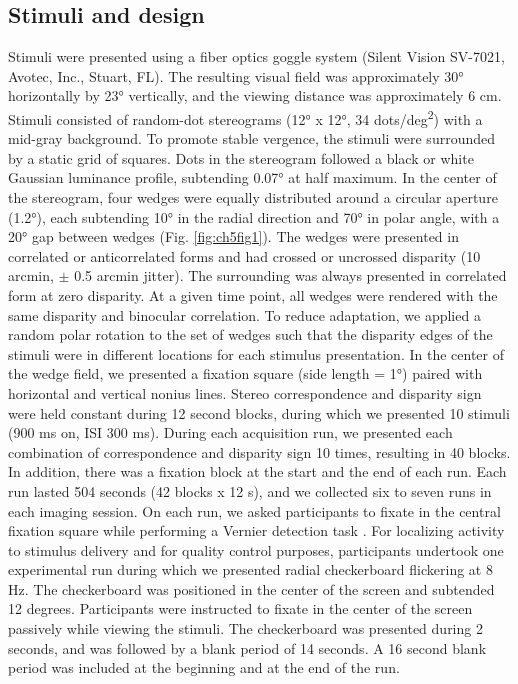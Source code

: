 \subsection{Stimuli and design}
Stimuli were presented using a fiber optics goggle system (Silent Vision SV-7021, Avotec, Inc., Stuart, FL). The resulting visual field was approximately \ang{30} horizontally by \ang{23} vertically, and the viewing distance was approximately 6 cm. Stimuli consisted of random-dot stereograms (\ang{12} x \ang{12}, 34 dots/deg\textsuperscript{2}) with a mid-gray background. To promote stable vergence, the stimuli were surrounded by a static grid of squares. Dots in the stereogram followed a black or white Gaussian luminance profile, subtending \ang{0.07} at half maximum. In the center of the stereogram, four wedges were equally distributed around a circular aperture (\ang{1.2}), each subtending \ang{10} in the radial direction and \ang{70} in polar angle, with a \ang{20} gap between wedges (Fig. \ref{fig:ch5fig1}). The wedges were presented in correlated or anticorrelated forms and had crossed or uncrossed disparity (10 arcmin, $\pm$ 0.5 arcmin jitter). The surrounding was always presented in correlated form at zero disparity. At a given time point, all wedges were rendered with the same disparity and binocular correlation. To reduce adaptation, we applied a random polar rotation to the set of wedges such that the disparity edges of the stimuli were in different locations for each stimulus presentation. In the center of the wedge field, we presented a fixation square (side length =  \ang{1}) paired with horizontal and vertical nonius lines.
Stereo correspondence and disparity sign were held constant during 12 second blocks, during which we presented 10 stimuli (900 ms on, ISI 300 ms). During each acquisition run, we presented each combination of correspondence and disparity sign 10 times, resulting in 40 blocks. In addition, there was a fixation block at the start and the end of each run. Each run lasted 504 seconds (42 blocks x 12 s), and we collected six to seven runs in each imaging session. On each run, we asked participants to fixate in the central fixation square while performing a Vernier detection task \cite{Preston:2008dg}.
For localizing activity to stimulus delivery and for quality control purposes, participants undertook one experimental run during which we presented radial checkerboard flickering at 8 Hz. The checkerboard was positioned in the center of the screen and subtended 12 degrees. Participants were instructed to fixate in the center of the screen passively while viewing the stimuli. The checkerboard was presented during 2 seconds, and was followed by a blank period of 14 seconds. A 16 second blank period was included at the beginning and at the end of the run.

